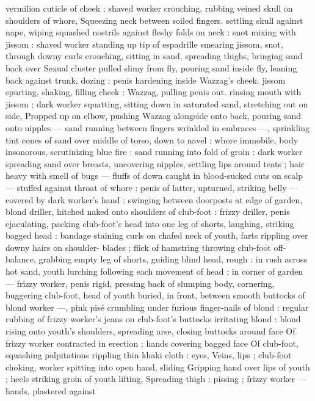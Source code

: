 vermilion cuticle of cheek ; shaved worker crouching, rubbing veined
skull on shoulders of whore, Squeezing neck between soiled fingers.
settling skull against nape, wiping squashed nostrils against fleshy
folds on neck : snot mixing with jissom : shaved worker standing up
tip of espadrille smearing jissom, snot, through downy curls
crouching, sitting in sand, spreading thighs, bringing sand back over
Sexual cluster pulled slimy from fly, pouring sand inside fly, leaning
back against trunk, dozing : penis hardening inside Wazzag's cheek.
jissom spurting, shaking, filling cheek : Wazzag, pulling penis out.
rinsing mouth with jissom ; dark worker squatting, sitting down in
saturated sand, stretching out on side, Propped up on elbow,
pushing Wazzag alongside onto back, pouring sand onto nipples ---
sand running between fingers wrinkled in embraces ---, sprinkling
tint cones of sand over middle of torso, down to navel : whore
immobile, body insonorous, scrutinizing blue fire : sand running into
fold of groin : dark worker spreading sand over breasts, uncovering
nipples, settling lips around teats ; hair heavy with smell of bugs ---
fluffs of down caught in blood-sucked cuts on scalp --- stuffed
against throat of whore : penis of latter, upturned, striking belly ---
covered by dark worker's hand : swinging between doorposts at edge
of garden, blond driller, hitched naked onto shoulders of club-foot :
frizzy driller, penis ejaculating, packing club-foot's head into one leg
of shorts, laughing, striking bagged head : bandage staining curls on
chafed neck of youth, farts rippling over downy hairs on shoulder-
blades ; flick of hamstring throwing club-foot off-balance, grabbing
empty leg of shorts, guiding blind head, rough : in rush across hot
sand, youth lurching following each movement of head ; in corner of
garden --- frizzy worker, penis rigid, pressing back of slumping
body, cornering, buggering club-foot, head of youth buried, in front,
between smooth buttocks of blond worker ---, pink pisé crumbling
under furious finger-nails of blond : regular rubbing of frizzy
worker's jeans on club-foot's buttocks irritating blond : blond rising
onto youth's shoulders, spreading arse, closing buttocks around face
Of frizzy worker contracted in erection ; hands covering bagged face
Of club-foot, squashing palpitations rippling thin khaki cloth : eyes,
Veins, lips ; club-foot choking, worker spitting into open hand, sliding
Gripping hand over lips of youth ; heels striking groin of youth lifting,
Spreading thigh : pissing ; frizzy worker --- hands, plastered against
